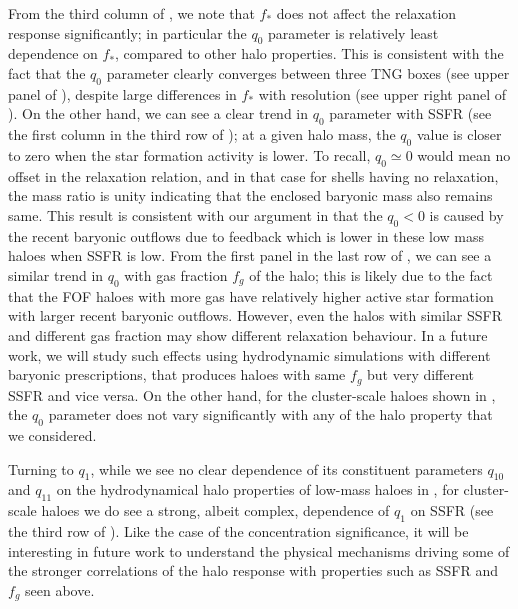 From the third column of , we note that $f_\ast$ does not affect the relaxation response significantly; in particular the $q_0$ parameter is relatively least dependence on $f_{\ast}$, compared to other halo properties. This is consistent with the fact that the $q_0$ parameter clearly converges between three TNG boxes (see upper panel of ), despite large differences in $f_\ast$ with resolution (see upper right panel of ).
On the other hand, we can see a clear trend  in $q_0$ parameter with SSFR (see the first column in the third row of ); at a given halo mass, the $q_0$ value is closer to zero when the star formation activity is lower. To recall, $q_0 \simeq 0$ would mean no offset in the relaxation relation, and in that case for shells having no relaxation, the mass ratio is unity indicating that the enclosed baryonic mass also remains same. This result is consistent with our argument in  that the $q_0<0$ is caused by the recent baryonic outflows due to feedback which is lower in these low mass haloes when SSFR is low.
From the first panel in the last row of , we can see a similar trend in $q_0$ with gas fraction $f_g$ of the halo; this is likely due to the fact that the FOF haloes with more gas have relatively higher active star formation with larger recent baryonic outflows. However, even the halos with similar SSFR and different gas fraction may show different relaxation behaviour. In a future work, we will study such effects using hydrodynamic simulations with different baryonic prescriptions, that produces haloes with same $f_g$ but very different SSFR and vice versa.
On the other hand, for the cluster-scale haloes shown in , the $q_0$ parameter does not vary significantly with any of the halo property that we considered.

Turning to $q_1$, while we see no clear dependence of its constituent parameters $q_{10}$ and $q_{11}$ on the hydrodynamical halo properties of low-mass haloes in , for cluster-scale haloes we do see a strong, albeit complex, dependence of $q_1$ on SSFR (see the third row of ). Like the case of the concentration significance, it will be interesting in future work to understand the physical mechanisms driving some of the stronger correlations of the halo response with properties such as SSFR and $f_g$ seen above.




